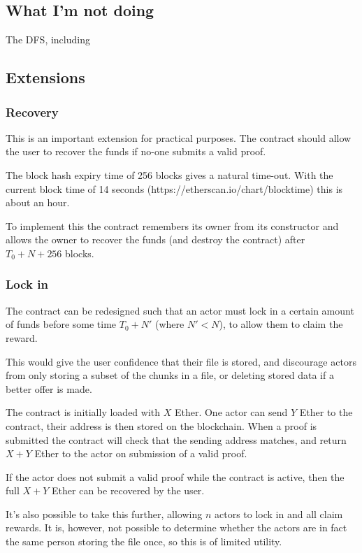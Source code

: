 \documentclass[10pt,twoside,a4paper]{article}
\begin{document}
\subsection{What I'm not doing}

The DFS, including 


\subsection{Extensions}

\subsubsection{Recovery}

This is an important extension for practical purposes.
The contract should allow the user to recover the funds if no-one submits a valid proof.

The block hash expiry time of 256 blocks gives a natural time-out.
With the current block time of 14 seconds (https://etherscan.io/chart/blocktime)
this is about an hour.

To implement this the contract remembers its owner from its constructor and allows the owner to recover the funds (and destroy the contract) after $T_0 + N + 256$ blocks.

\subsubsection{Lock in} \label{ext-lockin}

The contract can be redesigned such that an actor must lock in a certain amount of funds before some time $T_0 + N'$ (where $N' < N$),
to allow them to claim the reward.

This would give the user confidence that their file is stored, and discourage actors from only storing a subset of the chunks in a file,
or deleting stored data if a better offer is made.

The contract is initially loaded with $X$ Ether.
One actor can send $Y$ Ether to the contract, their address is then stored on the blockchain.
When a proof is submitted the contract will check that the sending address matches, and return $X + Y$ Ether to the actor
on submission of a valid proof.

If the actor does not submit a valid proof while the contract is active, then the full $X + Y$ Ether can be recovered by the user.

It's also possible to take this further, allowing $n$ actors to lock in and all claim rewards.
It is, however, not possible to determine whether the actors are in fact the same person storing the file once, so this is of limited utility.
\end{document}
